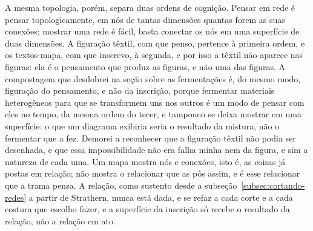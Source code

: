 A mesma topologia, porém, separa duas ordens de cognição. Pensar em rede é pensar topologicamente, em nós de tantas dimensões quantas forem as suas conexões; mostrar uma rede é fácil, basta conectar os nós em uma superfície de duas dimensões. A figuração têxtil, com que penso, pertence à primeira ordem, e os textos-mapa, com que inscrevo, à segunda, e por isso a têxtil não aparece nas figuras: ela é o pensamento que produz as figuras, e não uma das figuras. A compostagem que desdobrei na seção sobre as fermentações é, do mesmo modo, figuração do pensamento, e não da inscrição, porque fermentar materiais heterogêneos para que se transformem uns nos outros é um modo de pensar com eles no tempo, da mesma ordem do tecer, e tampouco se deixa mostrar em uma superfície: o que um diagrama exibiria seria o resultado da mistura, não o fermentar que a fez. Demorei a reconhecer que a figuração têxtil não podia ser desenhada, e que essa impossibilidade não era falha minha nem da figura, e sim a natureza de cada uma. Um mapa mostra nós e conexões, isto é, as coisas já postas em relação; não mostra o relacionar que as pôs assim, e é esse relacionar que a trama pensa. A relação, como sustento desde a subseção~\ref{subsec:cortando-redes} a partir de Strathern, nunca está dada, e se refaz a cada corte e a cada costura que escolho fazer, e a superfície da inscrição só recebe o resultado da relação, não a relação em ato.

